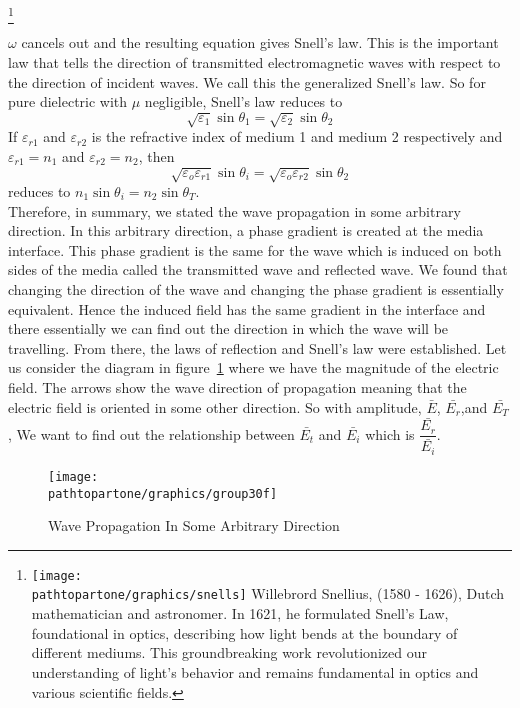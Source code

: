 \footnote{
\texttt{[image: \\pathtopartone/graphics/snells]} Willebrord Snellius, (1580 - 1626), Dutch mathematician and astronomer. In 1621, he formulated Snell's Law, foundational in optics, describing how light bends at the boundary of different mediums. This groundbreaking work revolutionized our understanding of light's behavior and remains fundamental in optics and various scientific fields.
}

$\omega$ cancels out and the resulting equation gives Snell's law. This is the important law that tells the direction of transmitted electromagnetic waves with respect to the direction of incident waves. We call this the generalized Snell's law. So for pure dielectric with $\mu$ negligible, Snell's law reduces to
$$\sqrt{\varepsilon_1}\sin\theta_1=\sqrt{\varepsilon_2}\sin\theta_2$$
\begin{equation}\end{equation}
If $\varepsilon_{r1}$ and $\varepsilon_{r2}$ is the refractive index of medium 1 and medium 2 respectively and $\varepsilon_{r1}=n_1$ and $\varepsilon_{r2}=n_2$, then
$$\sqrt{\varepsilon_o\varepsilon_{r1}}\sin\theta_i=\sqrt{\varepsilon_o\varepsilon_{r2}}\sin\theta_2$$
\begin{equation}\end{equation}
reduces to 
$n_1\sin\theta_i=n_2\sin\theta_T$. 
\begin{equation}\end{equation}
Therefore, in summary, we stated the wave propagation in some arbitrary direction. In this arbitrary direction, a phase gradient is created at the media interface. This phase gradient is the same for the wave which is induced on both sides of the media called the transmitted wave and reflected wave. We found that changing the direction of the wave and changing the phase gradient is essentially equivalent. Hence the induced field has the same gradient in the interface and there essentially we can find out the direction in which the wave will be travelling. From there, the laws of reflection and Snell's law were established. Let us consider the diagram in figure~\ref{fig:group30f} where we have the magnitude of the electric field. The arrows show the wave direction of propagation meaning that the electric field is oriented in some other direction. So with amplitude, $\bar{E}$, $\bar{E_r}$,and $\bar{E_T}$, We want to find out the relationship between $\bar{E_t}$ and $\bar{E_i}$ which is $\dfrac{\bar{E_r}}{\bar{E_i}}$.
\begin{figure}[h]
\centering
\texttt{[image: \\pathtopartone/graphics/group30f]}
\caption{Wave Propagation In Some Arbitrary Direction}
\label{fig:group30f}
\end{figure}

